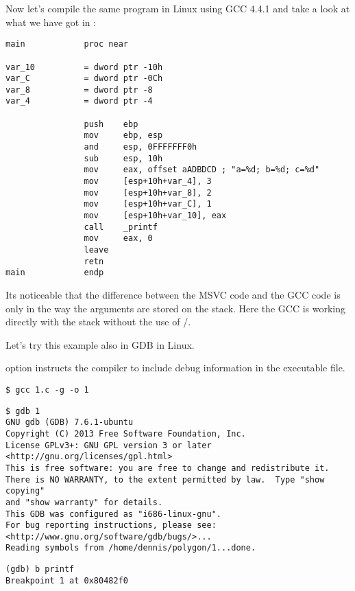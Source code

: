 
Now let's compile the same program in Linux using GCC 4.4.1 and take a look at what we have got in \IDA:

\begin{lstlisting}
main            proc near

var_10          = dword ptr -10h
var_C           = dword ptr -0Ch
var_8           = dword ptr -8
var_4           = dword ptr -4

                push    ebp
                mov     ebp, esp
                and     esp, 0FFFFFFF0h
                sub     esp, 10h
                mov     eax, offset aADBDCD ; "a=%d; b=%d; c=%d"
                mov     [esp+10h+var_4], 3
                mov     [esp+10h+var_8], 2
                mov     [esp+10h+var_C], 1
                mov     [esp+10h+var_10], eax
                call    _printf
                mov     eax, 0
                leave
                retn
main            endp
\end{lstlisting}

Its noticeable that the difference between the MSVC code and the GCC code is only in the way the arguments are stored on the stack.
Here the GCC is working directly with the stack without the use of \PUSH/\POP.


Let's try this example also in \ac{GDB} in Linux.

 option instructs the compiler to include debug information in the executable file.

\begin{lstlisting}
$ gcc 1.c -g -o 1
\end{lstlisting}

\begin{lstlisting}
$ gdb 1
GNU gdb (GDB) 7.6.1-ubuntu
Copyright (C) 2013 Free Software Foundation, Inc.
License GPLv3+: GNU GPL version 3 or later <http://gnu.org/licenses/gpl.html>
This is free software: you are free to change and redistribute it.
There is NO WARRANTY, to the extent permitted by law.  Type "show copying"
and "show warranty" for details.
This GDB was configured as "i686-linux-gnu".
For bug reporting instructions, please see:
<http://www.gnu.org/software/gdb/bugs/>...
Reading symbols from /home/dennis/polygon/1...done.
\end{lstlisting}

\begin{lstlisting}[caption=let's set breakpoint on \printf]
(gdb) b printf
Breakpoint 1 at 0x80482f0
\end{lstlisting}

